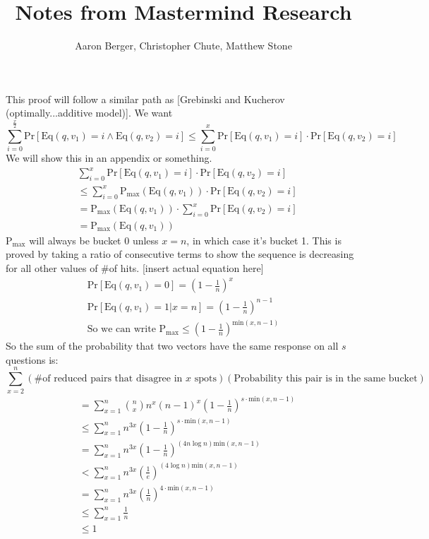 \documentclass[12pt, a4paper]{article}
\author{Aaron Berger, Christopher Chute, Matthew Stone}
\title{Notes from Mastermind Research}
\begin{document}
This proof will follow a similar path as [Grebinski and Kucherov (optimally...additive model)].
We want 
\begin{equation*}
	\sum_{i=0}^{\frac{x}{2}}\text{Pr}[\text{Eq}(q,v_1) = i \wedge \text{Eq}(q,v_2) = i] \leq \sum_{i=0}^x\text{Pr}[\text{Eq}(q,v_1) = i]\cdot\text{Pr}[ \text{Eq}(q,v_2) = i]
\end{equation*}
We will show this in an appendix or something.
\begin{align*}
&\sum_{i=0}^x\text{Pr}[\text{Eq}(q,v_1) = i]\cdot\text{Pr}[ \text{Eq}(q,v_2) = i] \\
&\le \sum_{i=0}^x\text{P}_\text{max}(\text{Eq}(q,v_1))\cdot\text{Pr}[ \text{Eq}(q,v_2) = i] \\
&= \text{P}_\text{max}(\text{Eq}(q,v_1)) \cdot \sum_{i=0}^x\text{Pr}[ \text{Eq}(q,v_2) = i] \\
&= \text{P}_\text{max}(\text{Eq}(q,v_1))
\end{align*}
P$_\text{max}$ will always be bucket 0 unless $x=n$, in which case it's bucket 1. This is proved by taking a ratio of consecutive terms to show the sequence is decreasing for all other values of \#of hits. [insert actual equation here]
\begin{align*}
\text{Pr}[\text{Eq}(q,v_1) =0] = \left(1-\frac{1}{n}\right)^x \\
\text{Pr}[\text{Eq}(q,v_1) =1 | x= n] = \left(1-\frac{1}{n}\right)^{n-1} \\
\text{So we can write P$_\text{max} \leq \left(1-\frac{1}{n}\right)^{\text{min}(x,n-1)}$}
\end{align*}
So the sum of the probability that two vectors have the same response on all $s$ questions is:
\begin{equation*}
\sum_{x=2}^n(\text{\# of reduced pairs that disagree in $x$ spots})(\text{Probability this pair is in the same bucket}) 
\end{equation*}
\begin{align*}
&=\sum_{x=1}^n \binom{n}{x}n^x(n-1)^x \left(1-\frac{1}{n}\right)^{s\cdot{\text{min}(x,n-1)}} \\
&\le \sum_{x=1}^n n^{3x} \left(1-\frac{1}{n}\right)^{s\cdot{\text{min}(x,n-1)}} \\
&= \sum_{x=1}^n n^{3x} \left(1-\frac{1}{n}\right)^{(4n\log n){\text{min}(x,n-1)}} \\
&< \sum_{x=1}^n n^{3x} \left(\frac{1}{e}\right)^{(4\log n){\text{min}(x,n-1)}} \\
&= \sum_{x=1}^n n^{3x} \left(\frac{1}{n}\right)^{4\cdot{\text{min}(x,n-1)}} \\
&\le \sum_{x=1}^n \frac{1}{n} \\
&\le 1
\end{align*}
\end{document}
